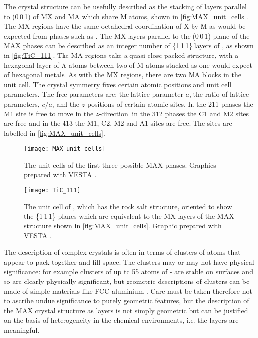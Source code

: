 The crystal structure can be usefully described as the stacking of layers parallel to (0\,0\,1) of MX and MA which share M atoms,  shown in \autoref{fig:MAX_unit_cells}. The MX regions have the same octahedral coordination of X by M as would be expected from phases such as . The MX layers parallel to the (0\,0\,1) plane of the MAX phases can be described as an integer number of \{1\,1\,1\} layers of , as shown in \autoref{fig:TiC_111}. The MA regions take a quasi-close packed structure, with a hexagonal layer of A atoms between two of M atoms stacked as one would expect of hexagonal metals. As with the MX regions, there are two MA blocks in the unit cell. The crystal symmetry fixes certain atomic positions and unit cell parameters. The free parameters are: the lattice parameter $a$, the ratio of lattice parameters, $c/a$, and the $z$-positions of certain atomic sites. In the 211 phases the M1 site is free to move in the $z$-direction, in the 312 phases the C1 and M2 sites are free and in the 413 the M1, C2, M2 and A1 sites are free. The sites are labelled in \autoref{fig:MAX_unit_cells}.


\begin{figure}
\centering
\texttt{[image: MAX\_unit\_cells]}
\caption[The MAX phase unit cells.]{The unit cells of the first three possible MAX phases. Graphics prepared with VESTA \cite{Momma2011}.\label{fig:MAX_unit_cells}}
\end{figure}




\begin{figure}
\centering
{}
\texttt{[image: TiC\_111]}
\caption[The unit cell of .]{The unit cell of , which has the rock salt structure, oriented to show the \{1\,1\,1\} planes which are equivalent to the MX layers of the MAX structure shown in \autoref{fig:MAX_unit_cells}. Graphic prepared with VESTA \cite{Momma2011}.\label{fig:TiC_111}}
\end{figure}


The description of complex crystals is often in terms of clusters of atoms that appear to pack together and fill space. The clusters may or may not have physical significance: for example clusters of up to 55 atoms of - are stable on surfaces and so are clearly physically significant, but geometric descriptions of clusters can be made of simple materials like FCC aluminium \cite{Steurer2006}. Care must be taken therefore not to ascribe undue significance to purely geometric features, but the description of the MAX crystal structure as layers is not simply geometric but can be justified on the basis of heterogeneity in the chemical environments, i.e. the layers are meaningful.


